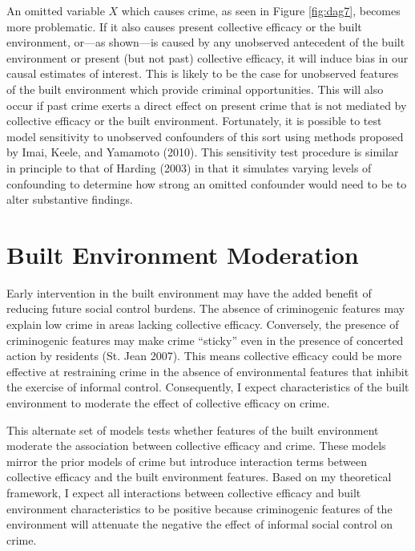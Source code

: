 \documentclass [11pt, proquest] {uwthesis}[2015/03/03]
\begin{document}
An omitted variable \(X\) which causes crime, as seen in Figure \ref{fig:dag7}, becomes more problematic. If it also causes present collective efficacy or the built environment, or---as shown---is caused by any unobserved antecedent of the built environment or present (but not past) collective efficacy, it will induce bias in our causal estimates of interest. This is likely to be the case for unobserved features of the built environment which provide criminal opportunities. This will also occur if past crime exerts a direct effect on present crime that is not mediated by collective efficacy or the built environment. Fortunately, it is possible to test model sensitivity to unobserved confounders of this sort using methods proposed by Imai, Keele, and Yamamoto (2010). This sensitivity test procedure is similar in principle to that of Harding (2003) in that it simulates varying levels of confounding to determine how strong an omitted confounder would need to be to alter substantive findings.

\hypertarget{bemoderation}{%
\chapter{Built Environment Moderation}\label{bemoderation}}

Early intervention in the built environment may have the added benefit of reducing future social control burdens. The absence of criminogenic features may explain low crime in areas lacking collective efficacy. Conversely, the presence of criminogenic features may make crime ``sticky'' even in the presence of concerted action by residents (St. Jean 2007). This means collective efficacy could be more effective at restraining crime in the absence of environmental features that inhibit the exercise of informal control. Consequently, I expect characteristics of the built environment to moderate the effect of collective efficacy on crime.

This alternate set of models tests whether features of the built environment moderate the association between collective efficacy and crime. These models mirror the prior models of crime but introduce interaction terms between collective efficacy and the built environment features. Based on my theoretical framework, I expect all interactions between collective efficacy and built environment characteristics to be positive because criminogenic features of the environment will attenuate the negative the effect of informal social control on crime.
\end{document}
